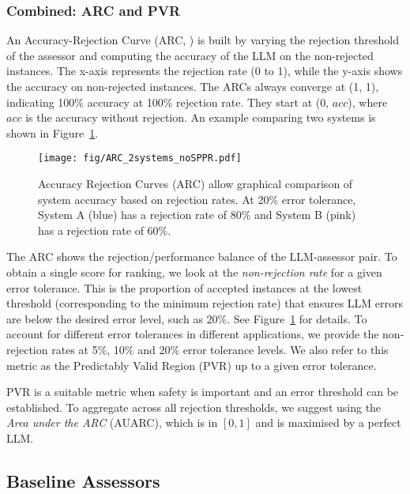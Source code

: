 \documentclass[11pt]{article}
\begin{document}
    

\subsubsection{Combined: ARC and PVR}
\label{subsubsec:combined_metrics}

An Accuracy-Rejection Curve (ARC, \citealp{nadeem10ARCs}) is built by varying the rejection threshold of the assessor and computing the accuracy of the LLM on the non-rejected instances. The x-axis represents the rejection rate (0 to 1), while the y-axis shows the accuracy on non-rejected instances. The ARCs always converge at (1, 1), indicating 100\% accuracy at 100\% rejection rate. They start at (0, $acc$), where $acc$ is the accuracy without rejection. 
An example comparing two systems is shown in Figure~\ref{fig:ARC}.

\begin{figure}[!ht]
    \centering
    \texttt{[image: fig/ARC\_2systems\_noSPPR.pdf]}
    \caption{Accuracy Rejection Curves (ARC) allow graphical comparison of system accuracy based on rejection rates. At 20\% error tolerance, System A (blue) has a rejection rate of 80\% and System B (pink) has a rejection rate of 60\%. %
    }
    \label{fig:ARC}
\end{figure}



The ARC shows the rejection/performance balance of the LLM-assessor pair. To obtain a single score for ranking, we look at the \textit{non-rejection rate} for a given error tolerance. This is the proportion of accepted instances at the lowest threshold (corresponding to the minimum rejection rate) that ensures  LLM errors are below the desired error level, such as 20\%. See Figure~\ref{fig:ARC} for details. To account for different error tolerances in different applications, we provide the non-rejection rates at 5\%, 10\% and 20\% error tolerance levels. We also refer to this metric as the Predictably Valid Region (PVR) up to a given error tolerance.

PVR is a suitable metric when safety is important and an error threshold can be established. To aggregate across all rejection thresholds, we suggest using the \textit{Area under the ARC} (AUARC), which is in $[0,1]$ and is maximised by a perfect LLM. 









\subsection{Baseline Assessors}
\label{subsec:baseline_assessors}
\end{document}
